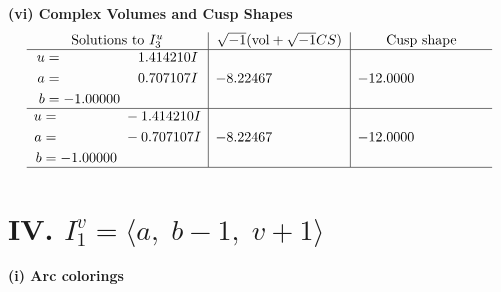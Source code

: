 \documentclass[1p]{elsarticle_modified}
\theoremstyle{definition}
\newcommand{\I}{\sqrt{-1}}
\begin{document}
\newpage\flushleft \textbf{(vi) Complex Volumes and Cusp Shapes}
$$\begin{array}{c|c|c}  
\text{Solutions to }I^u_{3}& \I (\text{vol} + \sqrt{-1}CS) & \text{Cusp shape}\\
 \hline 
\begin{aligned}
u &= \phantom{-0.000000 -}1.414210 I \\
a &= \phantom{-0.000000 -}0.707107 I \\
b &= -1.00000\phantom{ +0.000000I}\end{aligned}
 & -8.22467\phantom{ +0.000000I} & -12.0000\phantom{ +0.000000I} \\ \hline\begin{aligned}
u &= \phantom{-0.000000 } -1.414210 I \\
a &= \phantom{-0.000000 } -0.707107 I \\
b &= -1.00000\phantom{ +0.000000I}\end{aligned}
 & -8.22467\phantom{ +0.000000I} & -12.0000\phantom{ +0.000000I}\\
 \hline 
 \end{array}$$\newpage\newpage\renewcommand{\arraystretch}{1}
\centering \section*{IV. $I^v_{1}= \langle a,\;b-1,\;v+1 \rangle$}
\flushleft \textbf{(i) Arc colorings}\\
\end{document}
